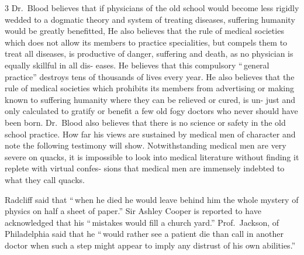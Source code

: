 \documentclass[10pt]{article}
\begin{document}
\begin{multicols}{3}
	Dr.~Blood believes that if physicians of the old school would become\linebreak
	less rigidly wedded to a dogmatic theory and system of treating
	diseases,\linebreak
	suffering humanity would be greatly benefitted, He also believes that\linebreak
	the rule of medical societies which does not allow its members to
	practice\linebreak
	specialities, but compels them to treat all diseases, is productive
	of\linebreak
	danger, suffering and death, as no physician is equally skillful in
	all dis-\columnbreak\linebreak
	eases. He believes that this compulsory ``\,general practice''
	destroys\linebreak
	tens of thousands of lives every year. He also believes that the
	rule of\linebreak
	medical societies which prohibits its members from advertising or
	making\linebreak
	known to suffering humanity where they can be relieved or cured, is
	un-\linebreak
	just and only calculated to gratify or benefit a few old fogy
	doctors who\linebreak
	never should have been born. Dr.~Blood also believes that there is no\linebreak
	science or safety in the old school practice. How far his views are
	sustained\linebreak
	by medical men of character and note the following testimony will
	show.\linebreak
	Notwithstanding medical men are very severe on quacks, it is
	impossible to\linebreak
	look into medical literature without finding it replete with virtual
	confes-\linebreak
	sions that medical men are immensely indebted to what they call quacks.

	Radcliff said that ``\,when he died he would leave behind him the\linebreak
	whole mystery of physics on half a sheet of paper.'' Sir Ashley
	Cooper is\linebreak
	reported to have acknowledged that his ``\,mistakes would fill a
	church\linebreak
	yard.'' Prof.~Jackson, of Philadelphia said that he ``\,would rather
	see a\linebreak
	patient die than call in another doctor when such a step might
	appear to\linebreak
	imply any distrust of his own abilities.''


\end{multicols}
\end{document}
